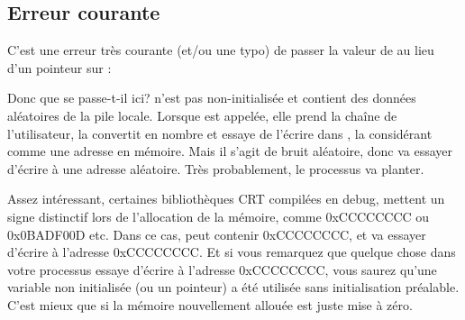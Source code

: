 \subsection{Erreur courante}

C'est une erreur très courante (et/ou une typo) de passer la valeur de  au
lieu d'un pointeur sur :



Donc que se passe-t-il ici?
 n'est pas non-initialisée et contient des données aléatoires de la pile
locale.
Lorsque \scanf est appelée, elle prend la chaîne de l'utilisateur, la convertit
en nombre et essaye de l'écrire dans , la considérant comme une adresse en
mémoire.
Mais il s'agit de bruit aléatoire, donc \scanf va essayer d'écrire à une adresse
aléatoire.
Très probablement, le processus va planter.

Assez intéressant, certaines bibliothèques \ac{CRT} compilées en debug, mettent
un signe distinctif lors de l'allocation de la mémoire, comme 0xCCCCCCCC ou
0x0BADF00D etc.
Dans ce cas,  peut contenir 0xCCCCCCCC, et \scanf va essayer d'écrire à
l'adresse 0xCCCCCCCC.
Et si vous remarquez que quelque chose dans votre processus essaye d'écrire à
l'adresse 0xCCCCCCCC, vous saurez qu'une variable non initialisée (ou un pointeur)
a été utilisée sans initialisation préalable.
C'est mieux que si la mémoire nouvellement allouée est juste mise à zéro.

